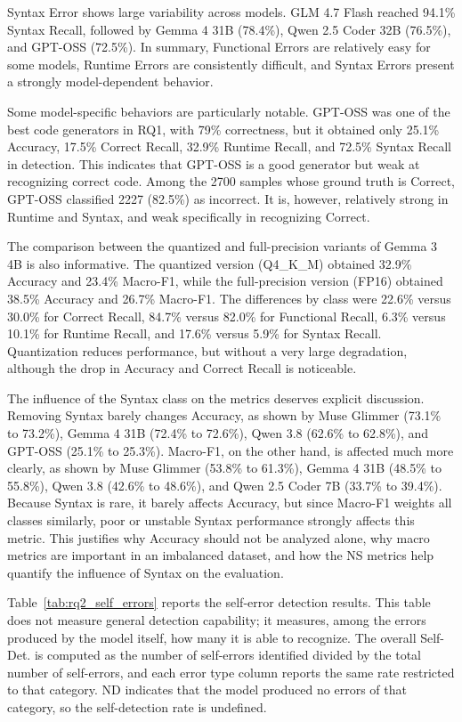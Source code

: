 Syntax Error shows large variability across models. GLM 4.7 Flash reached 94.1\% Syntax Recall, followed by Gemma 4 31B (78.4\%), Qwen 2.5 Coder 32B (76.5\%), and GPT-OSS (72.5\%). In summary, Functional Errors are relatively easy for some models, Runtime Errors are consistently difficult, and Syntax Errors present a strongly model-dependent behavior.

Some model-specific behaviors are particularly notable. GPT-OSS was one of the best code generators in RQ1, with 79\% correctness, but it obtained only 25.1\% Accuracy, 17.5\% Correct Recall, 32.9\% Runtime Recall, and 72.5\% Syntax Recall in detection. This indicates that GPT-OSS is a good generator but weak at recognizing correct code. Among the 2700 samples whose ground truth is Correct, GPT-OSS classified 2227 (82.5\%) as incorrect. It is, however, relatively strong in Runtime and Syntax, and weak specifically in recognizing Correct.

The comparison between the quantized and full-precision variants of Gemma 3 4B is also informative. The quantized version (Q4\_K\_M) obtained 32.9\% Accuracy and 23.4\% Macro-F1, while the full-precision version (FP16) obtained 38.5\% Accuracy and 26.7\% Macro-F1. The differences by class were 22.6\% versus 30.0\% for Correct Recall, 84.7\% versus 82.0\% for Functional Recall, 6.3\% versus 10.1\% for Runtime Recall, and 17.6\% versus 5.9\% for Syntax Recall. Quantization reduces performance, but without a very large degradation, although the drop in Accuracy and Correct Recall is noticeable.

The influence of the Syntax class on the metrics deserves explicit discussion. Removing Syntax barely changes Accuracy, as shown by Muse Glimmer (73.1\% to 73.2\%), Gemma 4 31B (72.4\% to 72.6\%), Qwen 3.8 (62.6\% to 62.8\%), and GPT-OSS (25.1\% to 25.3\%). Macro-F1, on the other hand, is affected much more clearly, as shown by Muse Glimmer (53.8\% to 61.3\%), Gemma 4 31B (48.5\% to 55.8\%), Qwen 3.8 (42.6\% to 48.6\%), and Qwen 2.5 Coder 7B (33.7\% to 39.4\%). Because Syntax is rare, it barely affects Accuracy, but since Macro-F1 weights all classes similarly, poor or unstable Syntax performance strongly affects this metric. This justifies why Accuracy should not be analyzed alone, why macro metrics are important in an imbalanced dataset, and how the NS metrics help quantify the influence of Syntax on the evaluation.

Table~\ref{tab:rq2_self_errors} reports the self-error detection results. This table does not measure general detection capability; it measures, among the errors produced by the model itself, how many it is able to recognize. The overall Self-Det. is computed as the number of self-errors identified divided by the total number of self-errors, and each error type column reports the same rate restricted to that category. ND indicates that the model produced no errors of that category, so the self-detection rate is undefined.

